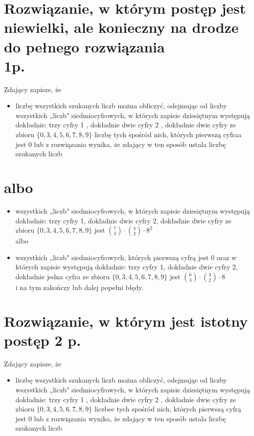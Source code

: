 \documentclass[10pt]{article}
\begin{document}
\section*{Rozwiązanie, w którym postęp jest niewielki, ale konieczny na drodze do pełnego rozwiązania \\
 1p.}
Zdający zapisze, że

\begin{itemize}
  \item liczbę wszystkich szukanych liczb można obliczyć, odejmując od liczby wszystkich „liczb" siedmiocyfrowych, w których zapisie dziesiętnym występują dokładnie: trzy cyfry 1 , dokładnie dwie cyfry 2 , dokładnie dwie cyfry ze zbioru $\{0,3,4,5,6,7,8,9\}$ liczbę tych spośród nich, których pierwszą cyfraa jest 0 lub z rozwiązania wynika, że zdający w ten sposób ustala liczbę szukanych liczb
\end{itemize}

\section*{albo}
\begin{itemize}
  \item wszystkich „liczb" siedmiocyfrowych, w których zapisie dziesiętnym występują dokładnie: trzy cyfry 1, dokładnie dwie cyfry 2, dokładnie dwie cyfry ze zbioru $\{0,3,4,5,6,7,8,9\}$ jest $\binom{7}{3} \cdot\binom{4}{2} \cdot 8^{2}$\\
albo
  \item wszystkich „liczb" siedmiocyfrowych, których pierwszą cyfrą jest 0 oraz w których zapisie występują dokładnie: trzy cyfry 1, dokładnie dwie cyfry 2, dokładnie jedna cyfra ze zbioru $\{0,3,4,5,6,7,8,9\}$ jest $\binom{6}{3} \cdot\binom{3}{2} \cdot 8$\\
i na tym zakończy lub dalej popełni błędy.
\end{itemize}

\section*{Rozwiązanie, w którym jest istotny postęp 2 p.}
Zdający zapisze, że

\begin{itemize}
  \item liczbę wszystkich szukanych liczb można obliczyć, odejmując od liczby wszystkich „liczb" siedmiocyfrowych, w których zapisie dziesiętnym występują dokładnie: trzy cyfry 1 , dokładnie dwie cyfry 2 , dokładnie dwie cyfry ze zbioru $\{0,3,4,5,6,7,8,9\}$ liczbee tych spośród nich, których pierwszą cyfrą jest 0 lub z rozwiązania wynika, że zdający w ten sposób ustala liczbę szukanych liczb
\end{itemize}
\end{document}
